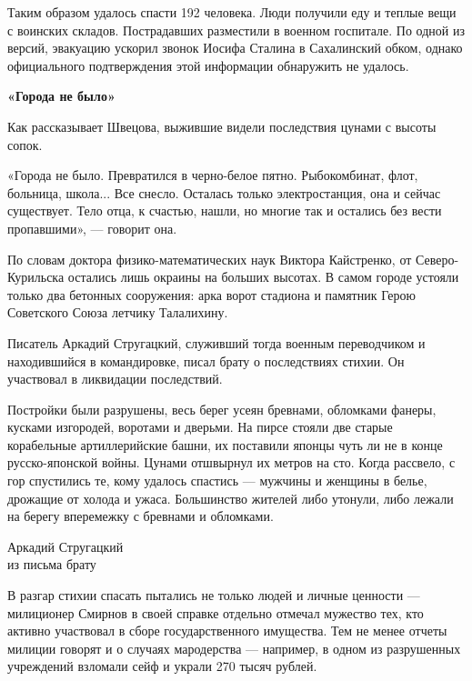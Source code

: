 Таким образом удалось спасти 192 человека. Люди получили еду и теплые вещи с воинских складов. Пострадавших разместили в военном госпитале. По одной из версий, эвакуацию ускорил звонок Иосифа Сталина в Сахалинский обком, однако официального подтверждения этой информации обнаружить не удалось.

\textbf{«Города не было»}

Как рассказывает Швецова, выжившие видели последствия цунами с высоты сопок.

«Города не было. Превратился в черно-белое пятно. Рыбокомбинат, флот, больница, школа... Все снесло. Осталась только электростанция, она и сейчас существует. Тело отца, к счастью, нашли, но многие так и остались без вести пропавшими», --- говорит она.

По словам доктора физико-математических наук Виктора Кайстренко, от Северо-Курильска остались лишь окраины на больших высотах. В самом городе устояли только два бетонных сооружения: арка ворот стадиона и памятник Герою Советского Союза летчику Талалихину.

Писатель Аркадий Стругацкий, служивший тогда военным переводчиком и находившийся в командировке, писал брату о последствиях стихии. Он участвовал в ликвидации последствий.

\begin{fancyquotes}
    Постройки были разрушены, весь берег усеян бревнами, обломками фанеры, кусками изгородей, воротами и дверьми. На пирсе стояли две старые корабельные артиллерийские башни, их поставили японцы чуть ли не в конце русско-японской войны. Цунами отшвырнул их метров на сто. Когда рассвело, с гор спустились те, кому удалось спастись --- мужчины и женщины в белье, дрожащие от холода и ужаса. Большинство жителей либо утонули, либо лежали на берегу вперемежку с бревнами и обломками.\\

    \begin{flushright}
        Аркадий Стругацкий
        \\
        из письма брату
    \end{flushright}
\end{fancyquotes}

В разгар стихии спасать пытались не только людей и личные ценности --- милиционер Смирнов в своей справке отдельно отмечал мужество тех, кто активно участвовал в сборе государственного имущества. Тем не менее отчеты милиции говорят и о случаях мародерства --- например, в одном из разрушенных учреждений взломали сейф и украли 270 тысяч рублей.

